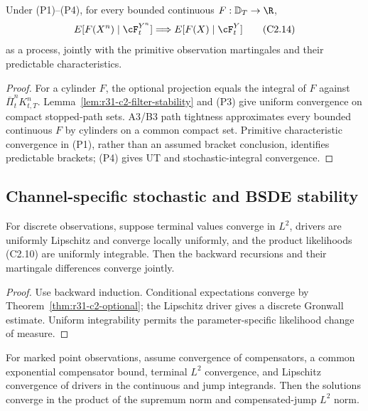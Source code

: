 \begin{theorem}
\label{thm:r31-c2-optional}
Under (P1)--(P4), for every bounded continuous
$F:\mathbb D_T\to\R$,
\[
 E[F(X^n)\mid\cF_t^{Y^n}]
 \Longrightarrow E[F(X)\mid\cF_t^Y]                     \tag{C2.14}
\]
as a process, jointly with the primitive observation martingales and their
predictable characteristics.
\end{theorem}

\begin{proof}
For a cylinder $F$, the optional projection equals the integral of $F$ against
$\overline\Pi_t^{n}K_{t,T}^{n}$.  Lemma~\ref{lem:r31-c2-filter-stability} and
(P3) give uniform convergence on compact stopped-path sets.  A3/B3 path
tightness approximates every bounded continuous $F$ by cylinders on a common
compact set.  Primitive characteristic convergence in (P1), rather than an
assumed bracket conclusion, identifies predictable brackets; (P4) gives UT
and stochastic-integral convergence.
\end{proof}

\subsection{Channel-specific stochastic and BSDE stability}

\begin{theorem}
\label{thm:r31-c2-discrete-bsde}
For discrete observations, suppose terminal values converge in $L^2$, drivers
are uniformly Lipschitz and converge locally uniformly, and the product
likelihoods (C2.10) are uniformly integrable.  Then the backward recursions and
their martingale differences converge jointly.
\end{theorem}

\begin{proof}
Use backward induction.  Conditional expectations converge by
Theorem~\ref{thm:r31-c2-optional}; the Lipschitz driver gives a discrete
Gronwall estimate.  Uniform integrability permits the parameter-specific
likelihood change of measure.
\end{proof}

\begin{theorem}
\label{thm:r31-c2-point-bsde}
For marked point observations, assume convergence of compensators, a common
exponential compensator bound, terminal $L^2$ convergence, and Lipschitz
convergence of drivers in the continuous and jump integrands.  Then the
solutions converge in the product of the supremum norm and compensated-jump
$L^2$ norm.
\end{theorem}

